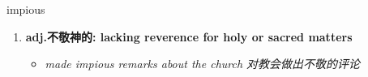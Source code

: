 
\begin{frame}
{\huge impious}
\begin{center}
\begin{enumerate}\Large
  \item \textbf{adj.不敬神的: lacking reverence for holy or sacred matters}
  \begin{itemize}
    \item \em{\Large{made impious remarks about the church 对教会做出不敬的评论}}
  \end{itemize}
\end{enumerate}
\end{center}
\end{frame}
